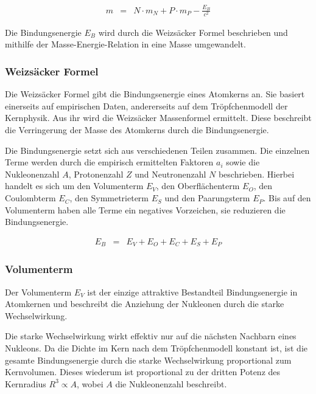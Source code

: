 \documentclass[12pt,a4paper]{scrartcl}
\numberwithin{equation}{section} %
\renewcommand{\[}{} %
\renewcommand{\]}{\noindent} %
\begin{document}
\[
\begin{eqnarray}
        m &=& N\cdot m_N + P\cdot m_P - \frac{E_B}{c^2}
\end{eqnarray}
\]

Die Bindungsenergie \(E_B\) wird durch die Weizsäcker Formel beschrieben
und mithilfe der Masse-Energie-Relation in eine Masse umgewandelt.

\hypertarget{weizsuxe4cker-formel}{%
\subsubsection{Weizsäcker Formel}\label{weizsuxe4cker-formel}}

Die Weizsäcker Formel gibt die Bindungsenergie eines Atomkerns an. Sie
basiert einerseits auf empirischen Daten, andererseits auf dem
Tröpfchenmodell der Kernphysik. Aus ihr wird die Weizsäcker Massenformel
ermittelt. Diese beschreibt die Verringerung der Masse des Atomkerns
durch die Bindungsenergie.

Die Bindungsenergie setzt sich aus verschiedenen Teilen zusammen. Die
einzelnen Terme werden durch die empirisch ermittelten Faktoren \(a_i\)
sowie die Nukleonenzahl \(A\), Protonenzahl \(Z\) und Neutronenzahl
\(N\) beschrieben. Hierbei handelt es sich um den Volumenterm \(E_V\),
den Oberflächenterm \(E_O\), den Coulombterm \(E_C\), den Symmetrieterm
\(E_S\) und den Paarungsterm \(E_P\). Bis auf den Volumenterm haben alle
Terme ein negatives Vorzeichen, sie reduzieren die Bindungsenergie.

\[
\begin{eqnarray}
        E_B &=& E_V + E_O + E_C + E_S + E_P
\end{eqnarray}
\]

\hypertarget{volumenterm}{%
\subsubsection{Volumenterm}\label{volumenterm}}

Der Volumenterm \(E_V\) ist der einzige attraktive Bestandteil
Bindungsenergie in Atomkernen und beschreibt die Anziehung der Nukleonen
durch die starke Wechselwirkung.

Die starke Wechselwirkung wirkt effektiv nur auf die nächsten Nachbarn
eines Nukleons. Da die Dichte im Kern nach dem Tröpfchenmodell konstant
ist, ist die gesamte Bindungsenergie durch die starke Wechselwirkung
proportional zum Kernvolumen. Dieses wiederum ist proportional zu der
dritten Potenz des Kernradius \(R^3\propto A\), wobei \(A\) die
Nukleonenzahl beschreibt.
\end{document}
